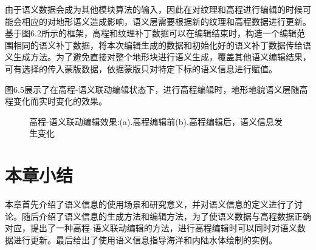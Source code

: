 由于语义数据会成为其他模块算法的输入，因此在对纹理和高程进行编辑的时候可能会相应的对地形语义造成影响，语义层需要根据新的纹理和高程数据进行更新。基于图6.2所示的框架，高程和纹理补丁数据可以在编辑结束时，构造一个编辑范围相同的语义补丁数据，将本次编辑生成的数据和初始化好的语义补丁数据传给语义生成方法。为了避免直接对整个地形块进行语义生成，覆盖其他语义编辑结果，可有选择的传入蒙版数据，依据蒙版只对特定下标的语义信息进行赋值。\par
图6.5展示了在高程-语义联动编辑状态下，进行高程编辑时，地形地貌语义层随高程变化而实时变化的效果。
\begin{figure}[H]
    \centering
    \caption{高程-语义联动编辑效果:(a).高程编辑前(b).高程编辑后，语义信息发生变化}
\end{figure}

\section{本章小结}
本章首先介绍了语义信息的使用场景和研究意义，并对语义信息的定义进行了讨论。随后介绍了语义信息的生成方法和编辑方法，为了使语义数据与高程数据正确对应，提出了一种高程-语义联动编辑的方法，进行高程编辑时可以同时对语义数据进行更新。最后给出了使用语义信息指导海洋和内陆水体绘制的实例。